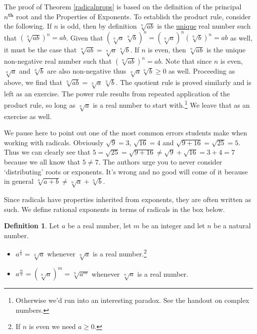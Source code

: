 \documentclass[11pt]{article}
\theoremstyle{definition}  %
\newtheorem{defn}{\bf Definition}
\newcommand{\bbm}{\begin{boxedminipage}{6.41in}}
\newcommand{\ebm}{\end{boxedminipage}}
\begin{document}
The proof of Theorem \ref{radicalprops} is based on the definition of the principal $n^{\textbf{th}}$ root and the Properties of Exponents.  To establish the product rule, consider the following.  If $n$ is odd, then by definition $\sqrt[n]{ab}$ is the \underline{unique} real number such that $(\sqrt[n]{ab})^{n} = ab$.  Given that $( \sqrt[n]{a} \, \sqrt[n]{b})^n = (\sqrt[n]{a})^n (\sqrt[n]{b})^n = ab$ as well, it must be the case that $\sqrt[n]{ab} = \sqrt[n]{a} \, \sqrt[n]{b}$. If $n$ is even, then $\sqrt[n]{ab}$ is the unique non-negative real number such that $(\sqrt[n]{ab})^{n} = ab$.  Note that since $n$ is even, $\sqrt[n]{a}$ and $\sqrt[n]{b}$ are also non-negative thus $\sqrt[n]{a}\sqrt[n]{b} \geq 0$ as well.  Proceeding as above, we find that $\sqrt[n]{ab} = \sqrt[n]{a} \, \sqrt[n]{b}$.  The quotient rule is proved similarly and is left as an exercise.  The power rule results from repeated application of the product rule, so long as $\sqrt[n]{a}$ is a real number to start with.\footnote{Otherwise we'd run into an interesting paradox.  See the handout on complex numbers.}   We leave that as an exercise as well.

\smallskip

We pause here to point out one of the most common errors students make when working with radicals.  Obviously $\sqrt{9} = 3$, $\sqrt{16} = 4$ and $\sqrt{9 + 16} = \sqrt{25} = 5$.  Thus we can clearly see that $5 = \sqrt{25} = \sqrt{9 + 16} \neq \sqrt{9} + \sqrt{16} = 3 + 4 = 7$ because we all know that $5 \neq 7$.  The authors urge you to never consider `distributing' roots or exponents.  It's wrong and no good will come of it because in general $\sqrt[n]{a+b} \neq \sqrt[n]{a} + \sqrt[n]{b}$. 

\label{donotdistributeexponents}

\smallskip

Since radicals have properties inherited from exponents, they are often written as such.  We define rational exponents in terms of radicals in the box below.

\medskip

\colorbox{ResultColor}{\bbm

\begin{defn}  \label{rationalexponentdefn} Let $a$ be a real number, let $m$ be an integer and let $n$ be a natural number. 

\begin{itemize}

\item  $a^{\frac{1}{n}} = \sqrt[n]{a}$ whenever $\sqrt[n]{a}$ is a real number.\footnote{If $n$ is even we need $a \geq 0$.}

\item  $a^{\frac{m}{n}}  = \left(\sqrt[n]{a}\right)^m = \sqrt[n]{a^m}$ whenever $\sqrt[n]{a}$ is a real number.

\end{itemize}
\end{defn}

\ebm}
\end{document}

